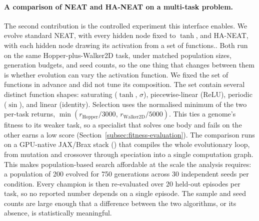 \documentclass[12pt]{article}
\begin{document}
\paragraph{A comparison of NEAT and HA-NEAT on a multi-task problem.}
The second contribution is the controlled experiment this interface enables.
We evolve standard NEAT, with every hidden node fixed to $\tanh$, and HA-NEAT, with each hidden node drawing its activation from a set of functions..
Both run on the same Hopper-plus-Walker2D task, under matched population sizes, generation budgets, and seed counts, so the one thing that changes between them is whether evolution can vary the activation function.
We fixed the set of functions in advance and did not tune its composition.
The set contain several distinct function shapes: saturating ($\tanh$, $\sigma$), piecewise-linear (ReLU), periodic ($\sin$), and linear (identity).
Selection uses the normalised minimum of the two per-task returns, $\min(r_{\text{Hopper}}/3000,\, r_{\text{Walker2D}}/5000)$.
This ties a genome's fitness to its weaker task, so a specialist that solves one body and fails on the other earns a low score (Section~\ref{subsec:fitness-evaluation}).
The comparison runs on a GPU-native JAX/Brax stack (\cite{freeman_brax_2021,wang_tensorized_2024}) that compiles the whole evolutionary loop, from mutation and crossover through speciation into a single computation graph.
This makes population-based search affordable at the scale the analysis requires: a population of 200 evolved for 750 generations across 30 independent seeds per condition.
Every champion is then re-evaluated over 20 held-out episodes per task, so no reported number depends on a single episode.
The sample and seed counts are large enough that a difference between the two algorithms, or its absence, is statistically meaningful.

\end{document}
